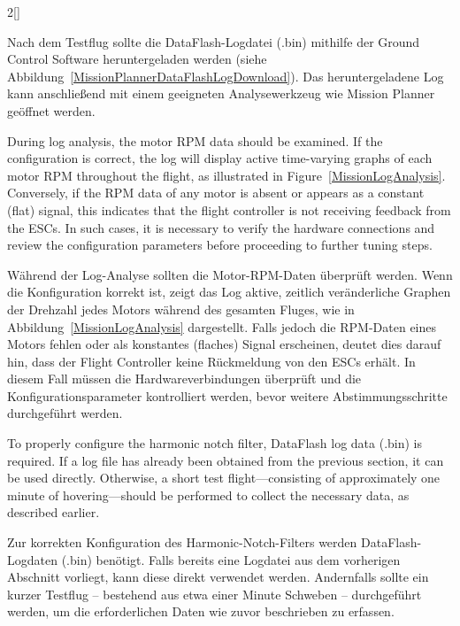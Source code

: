 \begin{paracol}{2}[]
\colger

Nach dem Testflug sollte die DataFlash-Logdatei (.bin) mithilfe der Ground Control Software heruntergeladen werden (siehe Abbildung~\ref{MissionPlannerDataFlashLogDownload}). Das heruntergeladene Log kann anschließend mit einem geeigneten Analysewerkzeug wie Mission Planner geöffnet werden.

\coleng

During log analysis, the motor RPM data should be examined. If the configuration is correct, the log will display active time-varying graphs of each motor RPM throughout the flight, as illustrated in Figure~\ref{MissionLogAnalysis}. Conversely, if the RPM data of any motor is absent or appears as a constant (flat) signal, this indicates that the flight controller is not receiving feedback from the ESCs. In such cases, it is necessary to verify the hardware connections and review the configuration parameters before proceeding to further tuning steps.

\colger

Während der Log-Analyse sollten die Motor-RPM-Daten überprüft werden. Wenn die Konfiguration korrekt ist, zeigt das Log aktive, zeitlich veränderliche Graphen der Drehzahl jedes Motors während des gesamten Fluges, wie in Abbildung~\ref{MissionLogAnalysis} dargestellt. Falls jedoch die RPM-Daten eines Motors fehlen oder als konstantes (flaches) Signal erscheinen, deutet dies darauf hin, dass der Flight Controller keine Rückmeldung von den ESCs erhält. In diesem Fall müssen die Hardwareverbindungen überprüft und die Konfigurationsparameter kontrolliert werden, bevor weitere Abstimmungsschritte durchgeführt werden.

\colende

\renewcommand{\deutschertitel}{Konfiguration des Harmonic-Notch-Filters mithilfe von Log-Daten}
\renewcommand{\englischertitel}{Harmonic Notch Filter Configuration Using Log Data}
\makrounterunterabschnitt
\label{FixHarmonicNotchByLogReadngs}

To properly configure the harmonic notch filter, DataFlash log data (.bin) is required. If a log file has already been obtained from the previous section, it can be used directly. Otherwise, a short test flight—consisting of approximately one minute of hovering—should be performed to collect the necessary data, as described earlier.

\colger

Zur korrekten Konfiguration des Harmonic-Notch-Filters werden DataFlash-Logdaten (.bin) benötigt. Falls bereits eine Logdatei aus dem vorherigen Abschnitt vorliegt, kann diese direkt verwendet werden. Andernfalls sollte ein kurzer Testflug – bestehend aus etwa einer Minute Schweben – durchgeführt werden, um die erforderlichen Daten wie zuvor beschrieben zu erfassen.


\end{paracol}
